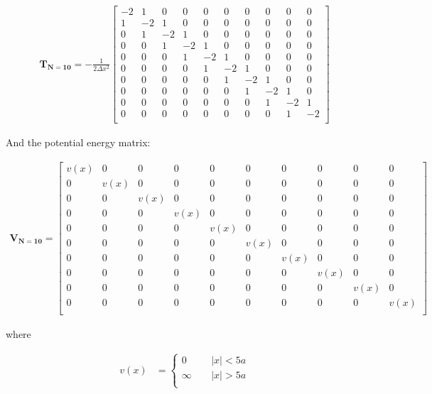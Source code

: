 \documentclass[10pt, oneside, letterpaper]{article}
\begin{document}
\begin{align*}
\bm{T_{N=10}} = -\frac{1}{2\Delta x^2}
\begin{bmatrix}
-2 & 1 & 0 & 0 & 0 & 0 & 0 & 0 & 0 & 0\\
 1 &-2 & 1 & 0 & 0 & 0 & 0 & 0 & 0 & 0\\
 0 & 1 &-2 & 1 & 0 & 0 & 0 & 0 & 0 & 0\\
 0 & 0 & 1 &-2 & 1 & 0 & 0 & 0 & 0 & 0\\
 0 & 0 & 0 & 1 &-2 & 1 & 0 & 0 & 0 & 0\\
 0 & 0 & 0 & 0 & 1 &-2 & 1 & 0 & 0 & 0\\
 0 & 0 & 0 & 0 & 0 & 1 &-2 & 1 & 0 & 0\\
 0 & 0 & 0 & 0 & 0 & 0 & 1 &-2 & 1 & 0\\
 0 & 0 & 0 & 0 & 0 & 0 & 0 & 1 &-2 & 1\\
 0 & 0 & 0 & 0 & 0 & 0 & 0 & 0 & 1 &-2\\
\end{bmatrix}
\end{align*}

And the potential energy matrix:

\begin{align*}
\bm{V_{N=10}} =
\begin{bmatrix}
 v(x) & 0 & 0 & 0 & 0 & 0 & 0 & 0 & 0 & 0\\
 0 & v(x) & 0 & 0 & 0 & 0 & 0 & 0 & 0 & 0\\
 0 & 0 & v(x) & 0 & 0 & 0 & 0 & 0 & 0 & 0\\
 0 & 0 & 0 & v(x) & 0 & 0 & 0 & 0 & 0 & 0\\
 0 & 0 & 0 & 0 & v(x) & 0 & 0 & 0 & 0 & 0\\
 0 & 0 & 0 & 0 & 0 & v(x) & 0 & 0 & 0 & 0\\
 0 & 0 & 0 & 0 & 0 & 0 & v(x) & 0 & 0 & 0\\
 0 & 0 & 0 & 0 & 0 & 0 & 0 & v(x) & 0 & 0\\
 0 & 0 & 0 & 0 & 0 & 0 & 0 & 0 & v(x) & 0\\
 0 & 0 & 0 & 0 & 0 & 0 & 0 & 0 & 0 & v(x)\\
\end{bmatrix}
\end{align*}

where

\begin{align*}
  v(x) &= \begin{cases}
          0       \quad \, & |x| < 5a \\
          \infty  \quad \, & |x| > 5a \\
     \end{cases}
\end{align*}
\end{document}
